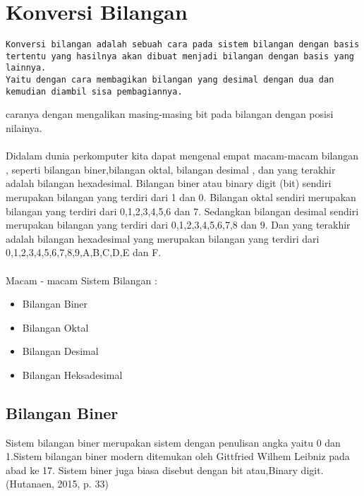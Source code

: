 ﻿%
%
\section{Konversi Bilangan}
\begin{verbatim}
Konversi bilangan adalah sebuah cara pada sistem bilangan dengan basis tertentu yang hasilnya akan dibuat menjadi bilangan dengan basis yang lainnya. 
Yaitu dengan cara membagikan bilangan yang desimal dengan dua dan kemudian diambil sisa pembagiannya.
\end{verbatim}
caranya dengan mengalikan masing-masing bit pada bilangan dengan posisi nilainya.
\\\\Didalam dunia perkomputer kita dapat mengenal empat macam-macam bilangan , seperti bilangan biner,bilangan oktal, bilangan desimal , dan yang terakhir adalah bilangan hexadesimal. Bilangan biner atau binary digit (bit) sendiri merupakan bilangan yang terdiri dari 1 dan 0. Bilangan oktal sendiri merupakan bilangan yang terdiri dari 0,1,2,3,4,5,6 dan 7.
Sedangkan bilangan desimal sendiri merupakan bilangan yang terdiri dari 0,1,2,3,4,5,6,7,8 dan 9. Dan yang terakhir adalah bilangan hexadesimal yang merupakan bilangan yang terdiri dari 0,1,2,3,4,5,6,7,8,9,A,B,C,D,E dan F.
\\\\Macam - macam Sistem Bilangan :
\begin{itemize}
\item Bilangan Biner
\item Bilangan Oktal
\item Bilangan Desimal
\item Bilangan Heksadesimal
\end{itemize}

\subsection{Bilangan Biner}
\cite{hutahaean2015konsep} Sistem bilangan biner merupakan sistem dengan penulisan angka yaitu 0 dan 1.Sistem bilangan biner modern ditemukan oleh Gittfried Wilhem Leibniz pada abad ke 17. Sistem biner juga biasa disebut dengan bit atau,Binary digit. (Hutanaen, 2015, p. 33)
